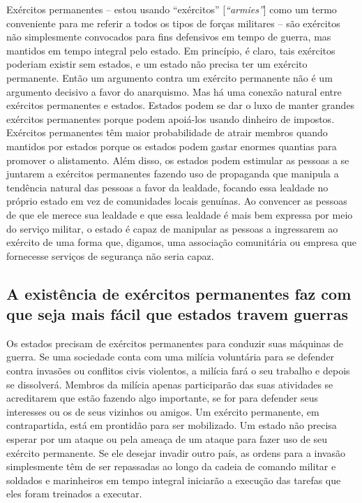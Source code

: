 Exércitos permanentes -- estou usando ``exércitos'' [\emph{``armies''}] como um termo conveniente para me referir a todos os tipos de forças militares -- são exércitos não simplesmente convocados para fins defensivos em tempo de guerra, mas mantidos em tempo integral pelo estado. Em princípio, é claro, tais exércitos poderiam existir sem estados, e um estado não precisa ter um exército permanente. Então um argumento contra um exército permanente não é um argumento decisivo a favor do anarquismo. Mas há uma conexão natural entre exércitos permanentes e estados. Estados podem se dar o luxo de manter grandes exércitos permanentes porque podem apoiá-los usando dinheiro de impostos. Exércitos permanentes têm maior probabilidade de atrair membros quando mantidos por estados porque os estados podem gastar enormes quantias para promover o alistamento. Além disso, os estados podem estimular as pessoas a se juntarem a exércitos permanentes fazendo uso de propaganda que manipula a tendência natural das pessoas a favor da lealdade, focando essa lealdade no próprio estado em vez de comunidades locais genuínas. Ao convencer as pessoas de que ele merece sua lealdade e que essa lealdade é mais bem expressa por meio do serviço militar, o estado é capaz de manipular as pessoas a ingressarem ao exército de uma forma que, digamos, uma associação comunitária ou empresa que fornecesse serviços de segurança não seria capaz.

\subsection*{A existência de exércitos permanentes faz com que seja mais fácil que estados travem guerras}

Os estados precisam de exércitos permanentes para conduzir suas máquinas de guerra. Se uma sociedade conta com uma milícia voluntária para se defender contra invasões ou conflitos civis violentos, a milícia fará o seu trabalho e depois se dissolverá. Membros da milícia apenas participarão das suas atividades se acreditarem que estão fazendo algo importante, se for para defender seus interesses ou os de seus vizinhos ou amigos. Um exército permanente, em contrapartida, está em prontidão para ser mobilizado. Um estado não precisa esperar por um ataque ou pela ameaça de um ataque para fazer uso de seu exército permanente. Se ele desejar invadir outro país, as ordens para a invasão simplesmente têm de ser repassadas ao longo da cadeia de comando militar e soldados e marinheiros em tempo integral iniciarão a execução das tarefas que eles foram treinados a executar.

